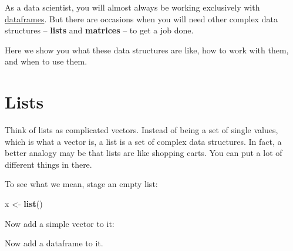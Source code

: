 \documentclass[
]{book}
\newenvironment{Shaded}{\begin{snugshade}}{\end{snugshade}}
\newcommand{\DataTypeTok}[1]{\textcolor[rgb]{0.13,0.29,0.53}{#1}}
\newcommand{\DecValTok}[1]{\textcolor[rgb]{0.00,0.00,0.81}{#1}}
\newcommand{\KeywordTok}[1]{\textcolor[rgb]{0.13,0.29,0.53}{\textbf{#1}}}
\newcommand{\NormalTok}[1]{#1}
\newcommand{\OperatorTok}[1]{\textcolor[rgb]{0.81,0.36,0.00}{\textbf{#1}}}
\newcommand{\StringTok}[1]{\textcolor[rgb]{0.31,0.60,0.02}{#1}}
\begin{document}
As a data scientist, you will almost always be working exclusively with \protect\hyperlink{dataframes}{dataframes}. But there are occasions when you will need other complex data structures -- \textbf{lists} and \textbf{matrices} -- to get a job done.

Here we show you what these data structures are like, how to work with them, and when to use them.

\hypertarget{lists}{%
\section*{Lists}\label{lists}}

Think of lists as complicated vectors. Instead of being a set of single values, which is what a vector is, a list is a set of complex data structures. In fact, a better analogy may be that lists are like shopping carts. You can put a lot of different things in there.

To see what we mean, stage an empty list:

\begin{Shaded}
\begin{Highlighting}[]
\NormalTok{x <-}\StringTok{ }\KeywordTok{list}\NormalTok{()}
\end{Highlighting}
\end{Shaded}

Now add a simple vector to it:

\begin{Shaded}
\end{Shaded}

Now add a dataframe to it.

\begin{Shaded}
\end{Shaded}
\end{document}
